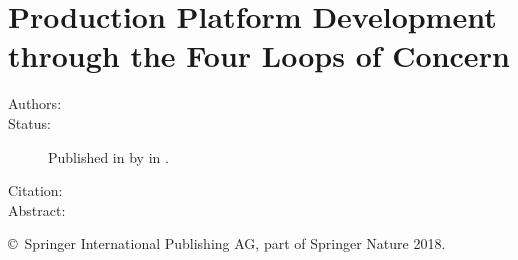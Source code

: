 \chapter[Production Platform Development through the FLC]{Production Platform Development through the Four Loops of Concern}\label{paper:MCPC2017}
\begin{description}
  \item[Authors:]
  \item[Status:] Published in \citeyear{SorensenMCPC2017} by  in .
  \item[Citation:]
  \item[Abstract:]
\end{description}

\vfill
\noindent\copyright~Springer International Publishing AG, part of Springer Nature 2018.

% 